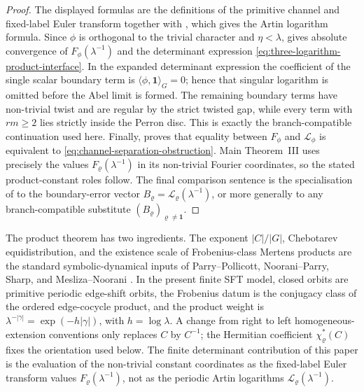 \documentclass[11pt,a4paper]{amsart}
\theoremstyle{plain}
\theoremstyle{definition}
\theoremstyle{remark}
\begin{document}
\begin{proof}
  The displayed formulas are the definitions of the primitive channel and
  fixed-label Euler transform together with
  , which gives the Artin
  logarithm formula.  Since \(\phi\) is orthogonal to the trivial character
  and \(\eta<\lambda\),  gives
  absolute convergence of \(F_\phi(\lambda^{-1})\) and the determinant
  expression \eqref{eq:three-logarithm-product-interface}.  In the expanded
  determinant expression the coefficient of the single scalar boundary term is
  \(\langle\phi,\mathbf1\rangle_G=0\); hence that singular logarithm is omitted
  before the Abel limit is formed.  The remaining boundary terms have
  non-trivial twist and are regular by the strict twisted gap, while every
  term with \(rm\ge2\) lies strictly inside the Perron disc.  This is exactly
  the branch-compatible continuation used here.
  Finally,  proves that equality
  between \(F_\phi\) and \(\mathcal L_\phi\) is equivalent to
  \eqref{eq:channel-separation-obstruction}.  Main Theorem~III uses
  precisely the values \(F_\varrho(\lambda^{-1})\) in its non-trivial
  Fourier coordinates, so the stated product-constant roles follow.  The
  final comparison sentence is the specialisation of
   to the boundary-error
  vector
  \(B_\varrho=\mathcal L_\varrho(\lambda^{-1})\), or more generally to any
  branch-compatible substitute \((B_\varrho)_{\varrho\ne\mathbf1}\).
\end{proof}

The product theorem has two ingredients.  The exponent \(|C|/|G|\),
Chebotarev equidistribution, and the existence scale of Frobenius-class Mertens
products are the standard symbolic-dynamical inputs of Parry--Pollicott,
Noorani--Parry, Sharp, and Mesliza--Noorani
\cite{ParryPollicott1986Chebotarev,NooraniParry1992ChebotarevShifts,Sharp1991Mertens,MeslizaNoorani1999FrobeniusMertens}.
In the present finite SFT model, closed orbits are primitive periodic edge-shift
orbits, the Frobenius datum is the conjugacy class of the ordered edge-cocycle
product, and the product weight is
\(\lambda^{-|\gamma|}=\exp(-h|\gamma|)\), with \(h=\log\lambda\).  A change from
right to left homogeneous-extension conventions only replaces \(C\) by
\(C^{-1}\); the Hermitian coefficient \(\chi_\varrho^\ast(C)\) fixes the
orientation used below.  The finite determinant contribution of this paper is
the evaluation of the non-trivial constant coordinates as the fixed-label Euler
transform values \(F_\varrho(\lambda^{-1})\), not as the periodic Artin
logarithms \(\mathcal L_\varrho(\lambda^{-1})\).
\end{document}
